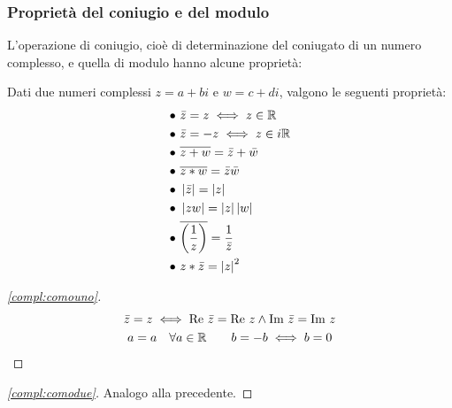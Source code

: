 \subsubsection{Proprietà del coniugio e del modulo}
L'operazione di coniugio, cioè di determinazione del coniugato di un numero complesso, e quella di modulo hanno alcune proprietà:
\begin{prop}
	Dati due numeri complessi $z=a+bi$ e $w=c+di$, valgono le seguenti proprietà:
	\begin{align}
		\label{compl:comouno}
		\bullet~ & \bar z=z\iff z\in\mathbb{R}                                  \\
		\label{compl:comodue}
		\bullet~ & \bar z=-z\iff z\in i\mathbb{R}                               \\
		\label{compl:comotre}
		\bullet~ & \overline{z+w}=\bar z+\bar w                         \\
		\label{compl:comoquattro}
		\bullet~ & \overline{z*w}=\bar z\bar w                          \\
		\label{compl:comocinque}
		\bullet~ & \left\lvert \bar z \right\rvert=\left\lvert z \right\rvert                                 \\
		\label{compl:comosei}
		\bullet~ & \left\lvert zw \right\rvert=\left\lvert z \right\rvert\left\lvert w \right\rvert                              \\
		\label{compl:comosette}
		\bullet~ & \overline{\left(\frac{1}{z}\right)}=\frac{1}{\bar z} \\
		\label{compl:comootto}
		\bullet~ & z*\bar z=\left\lvert z \right\rvert^2
	\end{align}
\end{prop}

\begin{proof}[\ref{compl:comouno}]
	\begin{gather*}
		\bar z = z \iff \textrm{Re } \bar z = \textrm{Re } z \land \textrm{Im } \bar z = \textrm{Im } z \\
		a = a \quad \forall a \in \mathbb{R} \qquad b = -b \iff b = 0
	\end{gather*}
\end{proof}
\begin{proof}[\ref{compl:comodue}]
	Analogo alla precedente.
\end{proof}


